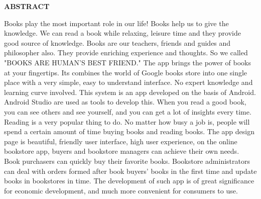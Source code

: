 \newpage
\begin{center}
\thispagestyle{empty}
\vspace*{2\baselineskip}
\LARGE{\textbf{ABSTRACT}}\\[0.5cm]
\end{center}
\thispagestyle{empty}
\doublespacing
\begin{normalsize}
Books play the most important role in our life! Books help us to give the knowledge. We can 
read a book while relaxing, leisure time and they provide good source of knowledge. Books 
are our teachers, friends and guides and philosopher also. They provide enriching experience 
and thoughts. So we called "BOOKS ARE HUMAN'S BEST FRIEND."
The app brings the power of books at your fingertips. Its combines the world of Google books 
store into one single place with a very simple, easy to understand interface.
No expert knowledge and learning curve involved.
This system is an app developed on the basis of Android. Android Studio  are used as tools to develop this. When you read a good book, you can see others and see yourself, and you can get a lot of insights every time. Reading is a very popular thing to do. No matter how busy a job is, people will spend a certain amount of time buying books and reading books. The app design page is beautiful, friendly user interface, high user experience, on the online bookstore app, buyers and bookstore managers can achieve their own needs. Book purchasers can quickly buy their favorite books. Bookstore administrators can deal with orders formed after book buyers' books in the first time and update books in bookstores in time. The development of such app is of great significance for economic development, and much more convenient for consumers to use.
\\[1cm]
\end{normalsize}